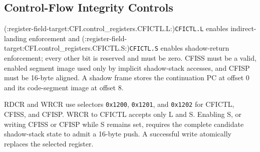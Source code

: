 \subsection{Control-Flow Integrity Controls}\label{section:cfi-control-registers}
(:register-field-target:CFI.control_registers.CFICTL.L:)\texttt{CFICTL.L} enables indirect-landing enforcement and
(:register-field-target:CFI.control_registers.CFICTL.S:)\texttt{CFICTL.S} enables shadow-return enforcement; every other bit is
reserved and must be zero. CFISS must be a valid, enabled segment image used only by implicit shadow-stack accesses, and
CFISP must be 16-byte aligned. A shadow frame stores the continuation PC at offset 0 and its code-segment image at offset 8.

RDCR and WRCR use selectors \texttt{0x1200}, \texttt{0x1201}, and \texttt{0x1202} for CFICTL, CFISS, and CFISP.
WRCR to CFICTL accepts only L and S. Enabling S, or writing CFISS or CFISP while S remains set, requires the complete candidate
shadow-stack state to admit a 16-byte push. A successful write atomically replaces the selected register.
